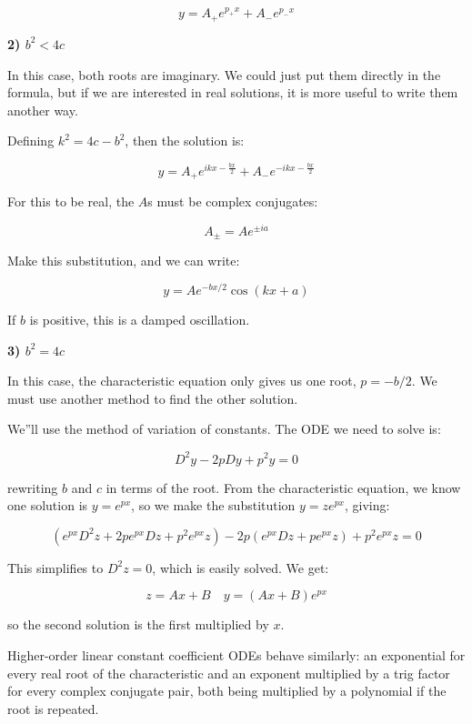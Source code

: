 $$y = A_{+}e^{p_{+}x} + A_{-}e^{p_{-}x}$$



\textbf{2) $b^2 < 4c$}



In this case, both roots are imaginary. We could just put them directly in the formula, but if we are interested in real solutions, it is more useful to write them another way.



Defining $k^2 = 4c - b^2$, then the solution is:

$$y = A_{+}e^{ikx - \frac{bx}{2}} + A_{-}e^{-ikx - \frac{bx}{2}}$$



For this to be real, the $A$s must be complex conjugates:

$$A_{\pm} = A e^{\pm ia}$$



Make this substitution, and we can write:

$$y = A e^{-bx/2} \cos (kx + a)$$



If $b$ is positive, this is a damped oscillation.



\textbf{3) $b^2 = 4c$}



In this case, the characteristic equation only gives us one root, $p = -b/2$. We must use another method to find the other solution.



We''ll use the method of variation of constants. The ODE we need to solve is:

$$D^2 y - 2p D y + p^2 y = 0$$

rewriting $b$ and $c$ in terms of the root. From the characteristic equation, we know one solution is $y = e^{px}$, so we make the substitution $y = z e^{px}$, giving:

$$(e^{px} D^2 z + 2p e^{px} D z + p^2 e^{px} z) - 2p(e^{px} D z + p e^{px} z) + p^2 e^{px} z = 0$$

This simplifies to $D^2 z = 0$, which is easily solved. We get:

$$z = A x + B \quad y = (A x + B)e^{px}$$

so the second solution is the first multiplied by $x$.



Higher-order linear constant coefficient ODEs behave similarly: an exponential for every real root of the characteristic and an exponent multiplied by a trig factor for every complex conjugate pair, both being multiplied by a polynomial if the root is repeated.



